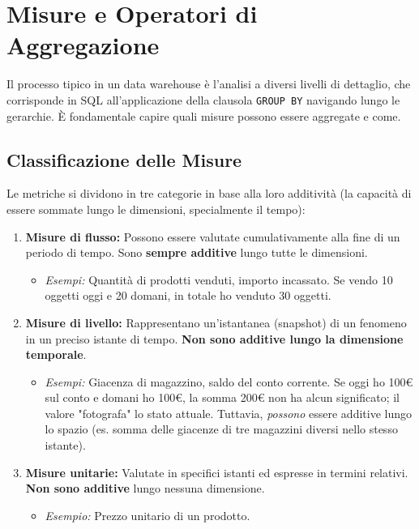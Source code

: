\section{Misure e Operatori di Aggregazione}

Il processo tipico in un data warehouse è l'analisi a diversi livelli di dettaglio, che corrisponde in SQL all'applicazione della clausola \texttt{GROUP BY} navigando lungo le gerarchie. È fondamentale capire quali misure possono essere aggregate e come.

\subsection{Classificazione delle Misure}
Le metriche si dividono in tre categorie in base alla loro additività (la capacità di essere sommate lungo le dimensioni, specialmente il tempo):

\begin{enumerate}
    \item \textbf{Misure di flusso:} Possono essere valutate cumulativamente alla fine di un periodo di tempo. Sono \textbf{sempre additive} lungo tutte le dimensioni.
    \begin{itemize}
        \item \textit{Esempi:} Quantità di prodotti venduti, importo incassato. Se vendo 10 oggetti oggi e 20 domani, in totale ho venduto 30 oggetti.
    \end{itemize}
    \item \textbf{Misure di livello:} Rappresentano un'istantanea (snapshot) di un fenomeno in un preciso istante di tempo. \textbf{Non sono additive lungo la dimensione temporale}.
    \begin{itemize}
        \item \textit{Esempi:} Giacenza di magazzino, saldo del conto corrente. Se oggi ho 100€ sul conto e domani ho 100€, la somma 200€ non ha alcun significato; il valore "fotografa" lo stato attuale. Tuttavia, \textit{possono} essere additive lungo lo spazio (es. somma delle giacenze di tre magazzini diversi nello stesso istante).
    \end{itemize}
    \item \textbf{Misure unitarie:} Valutate in specifici istanti ed espresse in termini relativi. \textbf{Non sono additive} lungo nessuna dimensione.
    \begin{itemize}
        \item \textit{Esempio:} Prezzo unitario di un prodotto.
    \end{itemize}
\end{enumerate}


